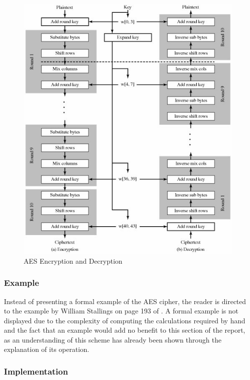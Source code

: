 \documentclass[a4paper,12pt]{report}
\begin{document}
\begin{figure}[htb]
\centering
\includegraphics[scale=0.7]{images/decrypt1.jpg}
\caption{AES Encryption and Decryption}
\label{fig:decrypt1}
\end{figure}

\subsubsection{Example}

Instead of presenting a formal example of the AES cipher, the reader is directed to the example by William Stallings on page 193 of \cite{willstallings}. A formal example is not displayed due to the complexity of computing the calculations required by hand and the fact that an example would add no benefit to this section of the report, as an understanding of this scheme has already been shown through the explanation of its operation. 

\subsubsection{Implementation}
\end{document}
